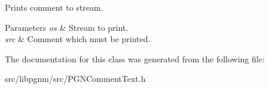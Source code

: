 Prints comment to stream. 


\begin{DoxyParams}{Parameters}
{\em os} & Stream to print. \\
\hline
{\em src} & Comment which must be printed. \\
\hline
\end{DoxyParams}


The documentation for this class was generated from the following file:\begin{DoxyCompactItemize}
\item 
src/libpgnm/src/PGNCommentText.h\end{DoxyCompactItemize}
